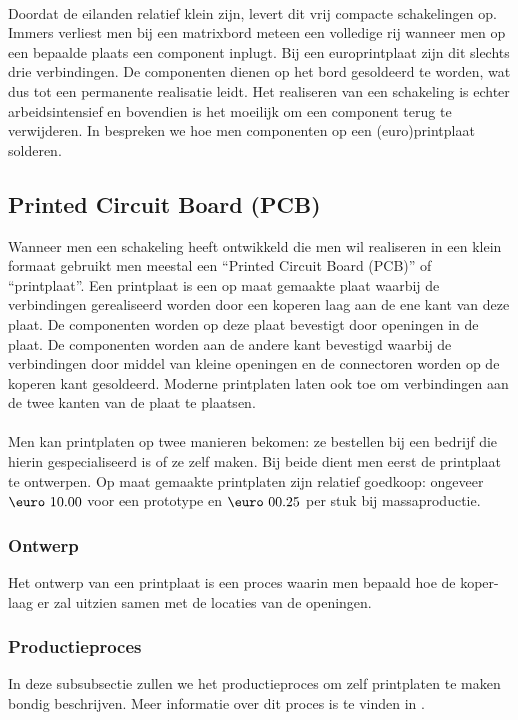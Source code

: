\paragraph{}
Doordat de eilanden relatief klein zijn, levert dit vrij compacte schakelingen op. Immers verliest men bij een matrixbord meteen een volledige rij wanneer men op een bepaalde plaats een component inplugt. Bij een europrintplaat zijn dit slechts drie verbindingen. De componenten dienen op het bord gesoldeerd te worden, wat dus tot een permanente realisatie leidt. Het realiseren van een schakeling is echter arbeidsintensief en bovendien is het moeilijk om een component terug te verwijderen. In  bespreken we hoe men componenten op een (euro)printplaat solderen.
\subsection{Printed Circuit Board (PCB)}
Wanneer men een schakeling heeft ontwikkeld die men wil realiseren in een klein formaat gebruikt men meestal een ``Printed Circuit Board (PCB)'' of ``printplaat''. Een printplaat is een op maat gemaakte plaat waarbij de verbindingen gerealiseerd worden door een koperen laag aan de ene kant van deze plaat. De componenten worden op deze plaat bevestigt door openingen in de plaat. De componenten worden aan de andere kant bevestigd waarbij de verbindingen door middel van kleine openingen en de connectoren worden op de koperen kant gesoldeerd. Moderne printplaten laten ook toe om verbindingen aan de twee kanten van de plaat te plaatsen.
\paragraph{}
Men kan printplaten op twee manieren bekomen: ze bestellen bij een bedrijf die hierin gespecialiseerd is of ze zelf maken. Bij beide dient men eerst de printplaat te ontwerpen. Op maat gemaakte printplaten zijn relatief goedkoop: ongeveer $\mbox{\euro}\ 10.00$ voor een prototype en $\mbox{\euro}\ 00.25$ per stuk bij massaproductie.
\subsubsection{Ontwerp}
Het ontwerp van een printplaat is een proces waarin men bepaald hoe de koper-laag er zal uitzien samen met de locaties van de openingen.
\subsubsection{Productieproces}
In deze subsubsectie zullen we het productieproces om zelf printplaten te maken bondig beschrijven. Meer informatie over dit proces is te vinden in \cite{fabricatingprintedcircuitboards}.
